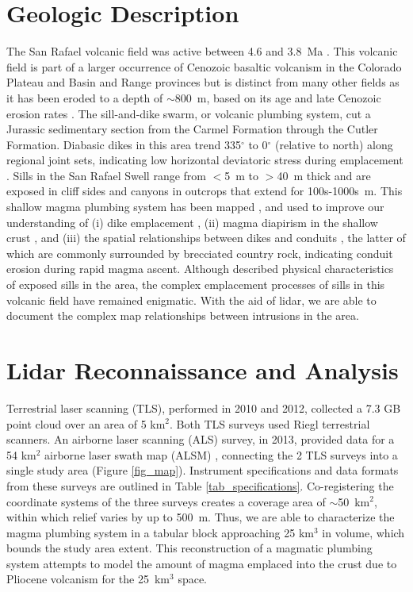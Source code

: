 \section{Geologic Description}

The San Rafael volcanic field was active between 4.6 and 3.8~Ma \citep{delaney1997physical}. This volcanic field is part of a larger occurrence of Cenozoic basaltic volcanism in the Colorado Plateau and Basin and Range provinces but is distinct from many other fields as it has been eroded to a depth of $\sim$800~m, based on its age and late Cenozoic erosion rates \citep[e.g.]{pederson2002colorado}. The sill-and-dike swarm, or volcanic plumbing system, cut a Jurassic sedimentary section from the Carmel Formation through the Cutler Formation. Diabasic dikes in this area trend 335$^{\circ}$ to 0$^{\circ}$ (relative to north) along regional joint sets, indicating low horizontal deviatoric stress during emplacement \citep{delaney1997physical}. Sills in the San Rafael Swell range from $<$5~m to $>$40~m thick and are exposed in cliff sides and canyons in outcrops that extend for 100s-1000s~m. This shallow magma plumbing system has been mapped \citep{delaney1997physical}, and used to improve our understanding of (i) dike emplacement \citep{delaney1986field}, (ii) magma diapirism in the shallow crust \citep{diez2009evidence}, and (iii) the spatial relationships between dikes and conduits \citep{kiyosugi2012relationship}, the latter of which are commonly surrounded by brecciated country rock, indicating conduit erosion during rapid magma ascent. Although \citet{gartner1986geometry} described physical characteristics of exposed sills in the area, the complex emplacement processes of sills in this volcanic field have remained enigmatic. With the aid of lidar, we are able to document the complex map relationships between intrusions in the area.

\section{Lidar Reconnaissance and Analysis}

Terrestrial laser scanning (TLS), performed in 2010 and 2012, collected a 7.3 GB point cloud over an area of 5 km$^2$. Both TLS surveys used Riegl terrestrial scanners. An airborne laser scanning (ALS) survey, in 2013, provided data for a 54 km$^2$ airborne laser swath map (ALSM) \citep{richardson2013alsm}, connecting the 2 TLS surveys into a single study area (Figure \ref{fig_map}). Instrument specifications and data formats from these surveys are outlined in Table \ref{tab_specifications}. Co-registering the coordinate systems of the three surveys creates a coverage area of $\sim$50~km$^2$, within which relief varies by up to 500~m. Thus, we are able to characterize the magma plumbing system in a tabular block approaching 25 km$^3$ in volume, which bounds the study area extent. This reconstruction of a magmatic plumbing system attempts to model the amount of magma emplaced into the crust due to Pliocene volcanism for the 25~km$^3$ space.

